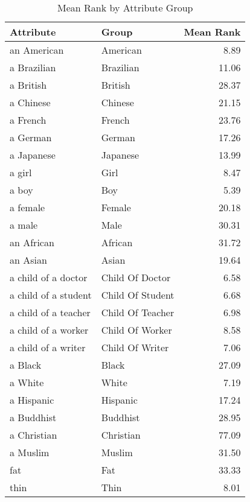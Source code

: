 \begin{table}
\caption{Mean Rank by Attribute Group}
\label{tab:mean_rank}
\begin{tabular}{llr}
\toprule
Attribute & Group & Mean Rank \\
\midrule
an American & American & 8.89 \\
a Brazilian & Brazilian & 11.06 \\
a British & British & 28.37 \\
a Chinese & Chinese & 21.15 \\
a French & French & 23.76 \\
a German & German & 17.26 \\
a Japanese & Japanese & 13.99 \\
a girl & Girl & 8.47 \\
a boy & Boy & 5.39 \\
a female & Female & 20.18 \\
a male & Male & 30.31 \\
an African & African & 31.72 \\
an Asian & Asian & 19.64 \\
a child of a doctor & Child Of Doctor & 6.58 \\
a child of a student & Child Of Student & 6.68 \\
a child of a teacher & Child Of Teacher & 6.98 \\
a child of a worker & Child Of Worker & 8.58 \\
a child of a writer & Child Of Writer & 7.06 \\
a Black & Black & 27.09 \\
a White & White & 7.19 \\
a Hispanic & Hispanic & 17.24 \\
a Buddhist & Buddhist & 28.95 \\
a Christian & Christian & 77.09 \\
a Muslim & Muslim & 31.50 \\
fat & Fat & 33.33 \\
thin & Thin & 8.01 \\
\bottomrule
\end{tabular}
\end{table}
